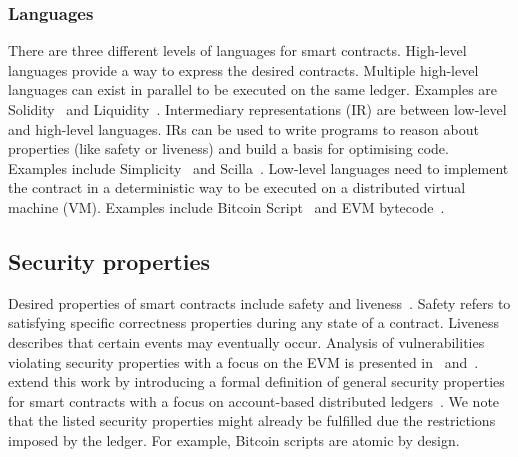 \subsubsection{Languages}
There are three different levels of languages for smart contracts.
High-level languages provide a way to express the desired contracts. Multiple high-level languages can exist in parallel to be executed on the same ledger. Examples are Solidity~\cite{Ethereum2018Solidity} and Liquidity~\cite{OCamlProSAS2018}.
Intermediary representations (IR) are between low-level and high-level languages. IRs can be used to write programs to reason about properties (like safety or liveness) and build a basis for optimising code. Examples include Simplicity~\cite{OConnor2017} and Scilla~\cite{Sergey2018}.
Low-level languages need to implement the contract in a deterministic way to be executed on a distributed virtual machine (VM). Examples include Bitcoin Script~\cite{BitcoinWiki2018Script} and EVM bytecode~\cite{Wood2014}.





\subsection{Security properties}
Desired properties of smart contracts include safety and liveness~\cite{Sergey2018}.
Safety refers to satisfying specific correctness properties during any state of a contract.
Liveness describes that certain events may eventually occur.
Analysis of vulnerabilities violating security properties with a focus on the EVM is presented in~\cite{Luu2016} and~\cite{Atzei2017}.
\citeauthor{Grishchenko2018} extend this work by introducing a formal definition of general security properties for smart contracts with a focus on account-based distributed ledgers~\cite{Grishchenko2018}. We note that the listed security properties might already be fulfilled due the restrictions imposed by the ledger. For example, Bitcoin scripts are atomic by design.

